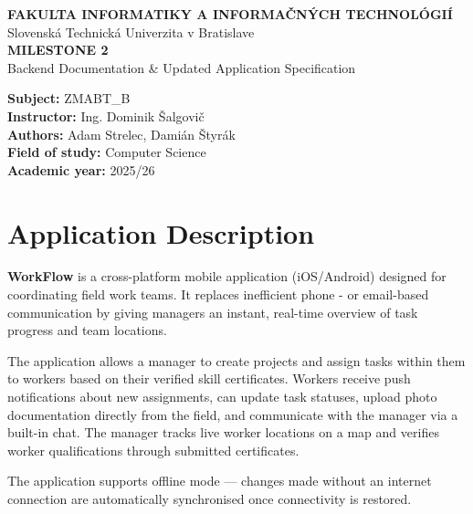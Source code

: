 \documentclass[12pt,a4paper]{article}
\begin{document}
\begin{titlepage}
\begin{center}
    \textbf{FAKULTA INFORMATIKY A INFORMAČNÝCH TECHNOLÓGIÍ}\\
    Slovenská Technická Univerzita v Bratislave\\[3cm]

    {\LARGE\textbf{MILESTONE 2}}\\[0.3cm]
    {\large Backend Documentation \& Updated Application Specification}\\[3cm]
\end{center}

\vfill

\textbf{Subject:} ZMABT\_B\\
\textbf{Instructor:} Ing. Dominik Šalgovič\\
\textbf{Authors:} Adam Strelec, Damián Štyrák\\
\textbf{Field of study:} Computer Science\\
\textbf{Academic year:} 2025/26
\end{titlepage}

\tableofcontents
\newpage

\section{Application Description}

\textbf{WorkFlow} is a cross-platform mobile application (iOS/Android) designed for coordinating field work teams. It replaces inefficient phone - or email-based communication by giving managers an instant, real-time overview of task progress and team locations.

The application allows a manager to create projects and assign tasks within them to workers based on their verified skill certificates. Workers receive push notifications about new assignments, can update task statuses, upload photo documentation directly from the field, and communicate with the manager via a built-in chat. The manager tracks live worker locations on a map and verifies worker qualifications through submitted certificates.

The application supports offline mode --- changes made without an internet connection are automatically synchronised once connectivity is restored.
\end{document}
